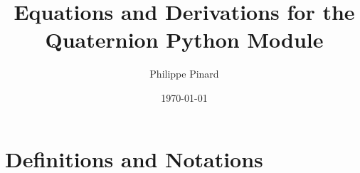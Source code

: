 \documentclass[letterpaper]{article}
\title{Equations and Derivations for the Quaternion Python Module}
\author{Philippe Pinard}
\date{\today}
\begin{document}
	\pagestyle{fancy}
	\fancyhf{}
	\setlength{\headheight}{15pt}
	\setlength{\headsep}{10pt}
	\rhead{\today}
	\rfoot{\thepage}
	\newcommand{\dev}{\ensuremath{\ \mathrm{d}}}
	\renewcommand{\labelitemii}{$\diamond$}
	\newcommand{\celsius}{^\circ C}
	\renewcommand{\tablename}{Table}
	\renewcommand{\figurename}{Figure}
	\newcommand{\conj}[1]{#1^\ast}
	\newcommand{\trans}[1]{#1^\mathrm{T}}
	\newcommand{\vx}{\hat{x}}
	\newcommand{\vy}{\hat{y}}
	\newcommand{\vz}{\hat{z}}
	\newcommand{\trace}[1]{\mathrm{Tr}(#1)}
	\newcommand{\quaternion}[2]{\llbracket #1, #2 \rrbracket}
	\newcommand{\quaternionL}[1]{\mathcal{#1}}
	\newcommand{\norm}[1]{\left\|#1\right\|}
	\newcommand{\im}{\mathit{i}}
	\newcommand{\direction}[1]{\left[ #1 \right]}
	\newcommand{\vecc}[3]{\left(#1,#2,#3\right)}
	
	
	\section{Definitions and Notations}
	
\end{document}
